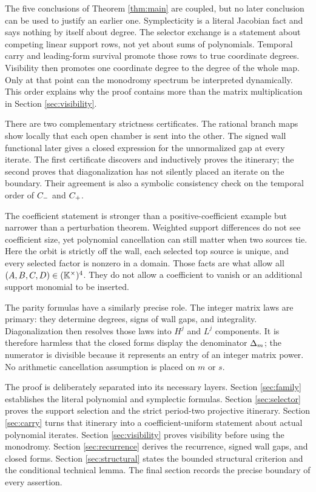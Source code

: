 \documentclass[11pt]{article}
\theoremstyle{definition}
\theoremstyle{remark}
\begin{document}
The five conclusions of Theorem \ref{thm:main} are coupled, but no later
conclusion can be used to justify an earlier one.  Symplecticity is a literal
Jacobian fact and says nothing by itself about degree.  The selector exchange
is a statement about competing linear support rows, not yet about sums of
polynomials.  Temporal carry and leading-form survival promote those rows to
true coordinate degrees.  Visibility then promotes one coordinate degree to
the degree of the whole map.  Only at that point can the monodromy spectrum
be interpreted dynamically.  This order explains why the proof contains
more than the matrix multiplication in Section \ref{sec:visibility}.

There are two complementary strictness certificates.  The rational branch
maps show locally that each open chamber is sent into the other.  The signed
wall functional later gives a closed expression for the unnormalized gap at
every iterate.  The first certificate discovers and inductively proves the
itinerary; the second proves that diagonalization has not silently placed an
iterate on the boundary.  Their agreement is also a symbolic consistency
check on the temporal order of \(C_{-}\) and \(C_{+}\).

The coefficient statement is stronger than a positive-coefficient example
but narrower than a perturbation theorem.  Weighted support differences do
not see coefficient size, yet polynomial cancellation can still matter when
two sources tie.  Here the orbit is strictly off the wall, each selected top
source is unique, and every selected factor is nonzero in a domain.  Those
facts are what allow all \((A,B,C,D)\in(\mathbb{K}^\times)^4\).  They do not allow a
coefficient to vanish or an additional support monomial to be inserted.

The parity formulas have a similarly precise role.  The integer matrix laws
are primary: they determine degrees, signs of wall gaps, and integrality.
Diagonalization then resolves those laws into \(H^j\) and \(L^j\) components.
It is therefore harmless that the closed forms display the denominator
\(\Delta_m\); the numerator is divisible because it represents an entry of an
integer matrix power.  No arithmetic cancellation assumption is placed on
\(m\) or \(s\).

The proof is deliberately separated into its necessary layers.  Section
\ref{sec:family} establishes the literal polynomial and symplectic formulas.
Section \ref{sec:selector} proves the support selection and the strict
period-two projective itinerary.  Section \ref{sec:carry} turns that itinerary
into a coefficient-uniform statement about actual polynomial iterates.
Section \ref{sec:visibility} proves visibility before using the monodromy.
Section \ref{sec:recurrence} derives the recurrence, signed wall gaps, and
closed forms.  Section \ref{sec:structural} states the bounded structural
criterion and the conditional technical lemma.  The final section records
the precise boundary of every assertion.
\end{document}
